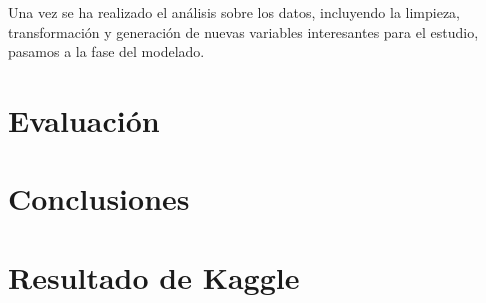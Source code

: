 \documentclass[
]{article}
\begin{document}
Una vez se ha realizado el análisis sobre los datos, incluyendo la
limpieza, transformación y generación de nuevas variables interesantes
para el estudio, pasamos a la fase del modelado.

\hypertarget{evaluaciuxf3n}{%
\section{\texorpdfstring{\textbf{Evaluación}}{Evaluación}}\label{evaluaciuxf3n}}

\hypertarget{conclusiones}{%
\section{\texorpdfstring{\textbf{Conclusiones}}{Conclusiones}}\label{conclusiones}}

\hypertarget{resultado-de-kaggle}{%
\section{\texorpdfstring{\textbf{Resultado de
Kaggle}}{Resultado de Kaggle}}\label{resultado-de-kaggle}}
\end{document}
